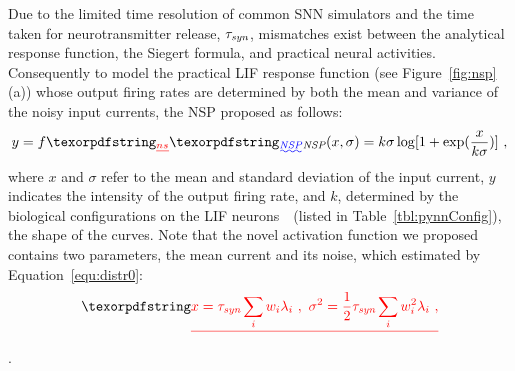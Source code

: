 	Due to the limited time resolution of common SNN simulators and the time taken for neurotransmitter release, $\tau_{\textit{\textrm{syn}}}$, mismatches exist between the analytical response function, the Siegert formula, and practical neural activities.
	Consequently to model the practical LIF response function (see Figure~\ref{fig:nsp}(a)) whose output firing rates are determined by both the mean and variance of the noisy input currents, the NSP \DIFdelbegin {}\DIFdelend \DIFaddbegin {}\DIFaddend proposed as follows:
	\begin{equation}
	y = f\DIFdelbegin \DIFdel{_{ns}}\DIFdelend \DIFaddbegin \DIFadd{_{\textit{\textrm{NSP}}}}\DIFaddend (x, \sigma) = k \sigma \log [1 + \exp(\frac{x}{k \sigma})]~,
	\label{equ:nsp}
	\end{equation}
	where $x$ and $\sigma$ refer to the mean and standard deviation of the input current, $y$ indicates the intensity of the output firing rate, and $k$, determined by the biological configurations on the LIF neurons~\citep{liu2016noisy}~(listed in Table~\ref{tbl:pynnConfig}), \DIFdelbegin {}\DIFdelend \DIFaddbegin {}\DIFaddend the shape of the curves.
	Note that the novel activation function we proposed contains two parameters, the mean current and its noise, which \DIFdelbegin {}\DIFdelend \DIFaddbegin {}\DIFaddend estimated by Equation~\ref{equ:distr0}: \DIFdelbegin \begin{displaymath}
	\DIFdel{x = \tau_{\textit{\textrm{syn}}}\sum_i w_i\lambda_{i}~, ~\sigma^2=\frac{1}{2}\tau_{\textit{\textrm{syn}}}\sum_i w_i^2\lambda_{i}~,
	}\end{displaymath}
\DIFdelend \DIFaddbegin {}\DIFaddend .


